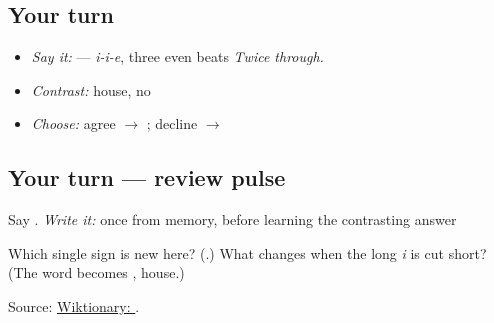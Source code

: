 \subsection*{Your turn}
\begin{itemize}
\raggedright
  \item \emph{Say it:} \textbf{} — \emph{i-i-e}, three even beats \emph{Twice through.}
  \item \emph{Contrast:} \textbf{} house, \textbf{} no
  \item \emph{Choose:} agree $\to$ \textbf{}; decline $\to$ \textbf{}
\end{itemize}

\subsection*{Your turn — review pulse}
Say \textbf{}. \emph{Write it:} \textbf{} once from memory, before learning the contrasting answer

\begin{tcolorbox}[breakable,colback=teal!4,colframe=teal!35!black,title={Before you move on}]
Which single sign is new here? (\textbf{}.) What changes when the long \emph{i} is cut short? (The word becomes \textbf{}, house.)

Source: \href{https://en.wiktionary.org/wiki/\%E3\%81\%84\%E3\%81\%84\%E3\%81\%88}{Wiktionary: }.
\end{tcolorbox}
